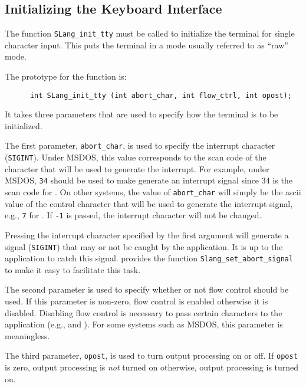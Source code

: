 
\subsection{Initializing the Keyboard Interface} %

  The function \verb|SLang_init_tty| must be called to initialize the
  terminal for single character input.  This puts the terminal in a mode
  usually referred to as ``raw'' mode.  
  
  The prototype for the function is:
\begin{verbatim} 
      int SLang_init_tty (int abort_char, int flow_ctrl, int opost);
\end{verbatim}
  It takes three parameters that are used to specify how the terminal is to
  be initialized.

  The first parameter, \verb|abort_char|, is used to specify the interrupt
  character ({\tt SIGINT}).  Under MSDOS, this value corresponds to the scan
  code of the character that will be used to generate the interrupt.  For
  example, under MSDOS, \verb|34| should be used to make  generate an
  interrupt signal since $34$ is the scan code for .  On other
  systems, the value of \verb|abort_char| will simply be the ascii value of
  the control character that will be used to generate the interrupt signal,
  e.g., {\tt 7} for .  If \verb|-1| is passed, the interrupt
  character will not be changed.

  Pressing the interrupt character specified by the first argument will
  generate a signal ({\tt SIGINT}) that may or not be caught by the
  application.  It is up to the application to catch this signal.  \slang{}
  provides the function \verb|Slang_set_abort_signal| to make it easy to
  facilitate this task.

  The second parameter is used to specify whether or not flow control should
  be used. If this parameter is non-zero, flow control is enabled otherwise
  it is disabled.  Disabling flow control is necessary to pass certain
  characters to the application (e.g.,  and ).
  For some systems such as MSDOS, this parameter is meaningless.
  
  The third parameter, \verb|opost|, is used to turn output processing on or
  off.  If \verb|opost| is zero, output processing is {\em not} turned on
  otherwise, output processing is turned on.

